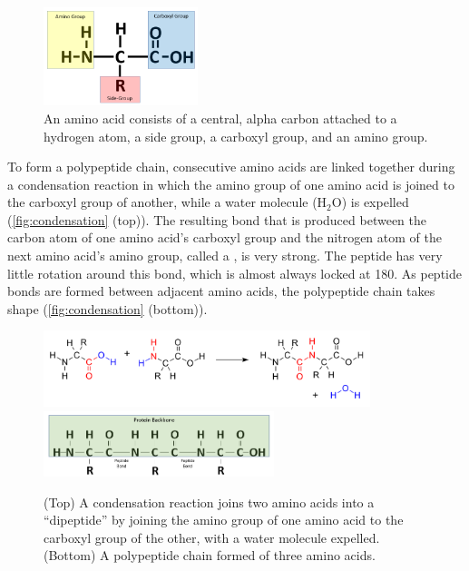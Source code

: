 \begin{figure}[h]
	\centering
	\mySfFamily
	\includegraphics[width = 0.4\textwidth]{../images/AminoAcid.png}
	\caption{An amino acid consists of a central, alpha carbon attached to a hydrogen atom, a side group, a carboxyl group, and an amino group.}
	\label{fig:AminoAcid}
\end{figure}

To form a polypeptide chain, consecutive amino acids are linked together during a condensation reaction in which the amino group of one amino acid is joined to the carboxyl group of another, while a water molecule ($\text{H}_2\text{O}$) is expelled (\autoref{fig:condensation} (top)). The resulting bond that is produced between the carbon atom of one amino acid's carboxyl group and the nitrogen atom of the next amino acid's amino group, called a , is very strong. The peptide has very little rotation around this bond, which is almost always locked at 180\textdegree. As peptide bonds are formed between adjacent amino acids, the polypeptide chain takes shape (\autoref{fig:condensation} (bottom)).

\begin{figure}[h]
	\centering
	\mySfFamily
	\includegraphics[width = 0.85\textwidth]{../images/dipeptide_reaction.png}\\[0.5ex]
	\includegraphics[width = 0.6\textwidth]{../images/Backbone.png}
	\caption{(Top) A condensation reaction joins two amino acids into a ``dipeptide'' by joining the amino group of one amino acid to the carboxyl group of the other, with a water molecule expelled. (Bottom) A polypeptide chain formed of three amino acids.}
	\label{fig:condensation}
\end{figure}

